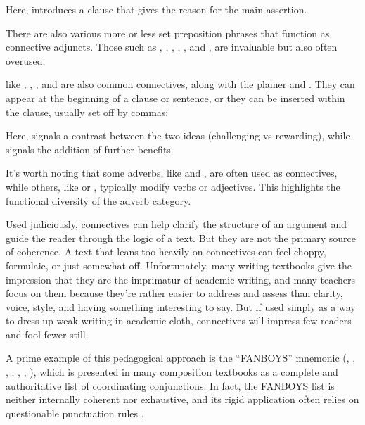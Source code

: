\z
Here,  introduces a clause that gives the reason for the main assertion.

There are also various more or less set preposition phrases that function as connective adjuncts. Those such as , , , , , and , are invaluable but also often overused.

 like , , , and  are also common connectives, along with the plainer  and . They can appear at the beginning of a clause or sentence, or they can be inserted within the clause, usually set off by commas:

\z
Here,  signals a contrast between the two ideas (challenging vs rewarding), while  signals the addition of further benefits.

It's worth noting that some adverbs, like  and , are often used as connectives, while others, like  or , typically modify verbs or adjectives. This highlights the functional diversity of the adverb category.

Used judiciously, connectives can help clarify the structure of an argument and guide the reader through the logic of a text. But they are not the primary source of coherence. A text that leans too heavily on connectives can feel choppy, formulaic, or just somewhat off. Unfortunately, many writing textbooks give the impression that they are the imprimatur of academic writing, and many teachers focus on them because they're rather easier to address and assess than clarity, voice, style, and having something interesting to say. But if used simply as a way to dress up weak writing in academic cloth, connectives will impress few readers and fool fewer still.

A prime example of this pedagogical approach is the \enquote{FANBOYS} mnemonic (, , , , , , ), which is presented in many composition textbooks as a complete and authoritative list of coordinating conjunctions. In fact, the FANBOYS list is neither internally coherent nor exhaustive, and its rigid application often relies on questionable punctuation rules \citep{Reynolds2011}.

